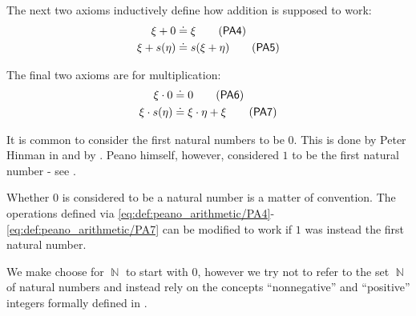 \begin{definition}
  \begin{thmenum}[resume=def:peano_arithmetic]
     The next two axioms inductively define how addition is supposed to work:
    \begin{align}
      \xi + 0       &\syneq \xi           \label{eq:def:peano_arithmetic/PA4}\tag{\logic{PA4}} \\
      \xi + s(\eta) &\syneq s(\xi + \eta) \label{eq:def:peano_arithmetic/PA5}\tag{\logic{PA5}}
    \end{align}

     The final two axioms are for multiplication:
    \begin{align}
      \xi \cdot 0       &\syneq 0                    \label{eq:def:peano_arithmetic/PA6}\tag{\logic{PA6}} \\
      \xi \cdot s(\eta) &\syneq \xi \cdot \eta + \xi \label{eq:def:peano_arithmetic/PA7}\tag{\logic{PA7}}
    \end{align}
  \end{thmenum}
\end{definition}

\begin{remark}\label{rem:peano_arithmetic_zero}
  It is common to consider the first natural numbers to be \( 0 \). This is done by Peter Hinman in  and by . Peano himself, however, considered \( 1 \) to be the first natural number - see \cite[1]{Peano1889}.

  Whether \( 0 \) is considered to be a natural number is a matter of convention. The operations defined via \eqref{eq:def:peano_arithmetic/PA4}-\eqref{eq:def:peano_arithmetic/PA7} can be modified to work if \( 1 \) was instead the first natural number.

  We make choose for \( \BbbN \) to start with \( 0 \), however we try not to refer to the set \( \BbbN \) of natural numbers and instead rely on the concepts \enquote{nonnegative} and \enquote{positive} integers formally defined in .
\end{remark}

